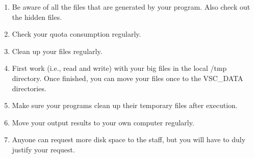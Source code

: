 \begin{enumerate}
\item  Be aware of all the files that are generated by your program. Also check out the hidden files.
\item  Check your quota consumption regularly.
\item  Clean up your files regularly.
\item  First work (i.e., read and write) with your big files in the local /tmp directory. Once finished, you can move your files once to the VSC\_DATA directories.
\item  Make sure your programs clean up their temporary files after execution.
\item  Move your output results to your own computer regularly.
\item  Anyone can request more disk space to the \hpc staff, but you will have to duly justify your request.
\end{enumerate}


%
%
%
%
%
%
%
%
%
%

